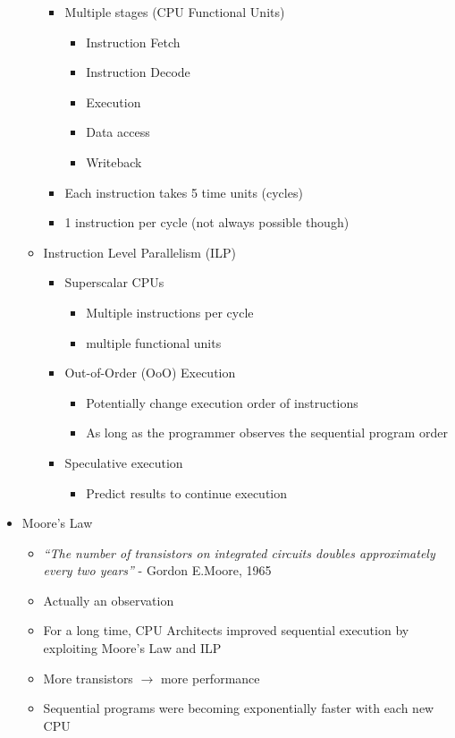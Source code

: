 \documentclass[a4paper]{article}
\begin{document}
\begin{itemize}
\begin{itemize}
\begin{itemize}
\item Multiple stages (CPU Functional Units)
\begin{itemize}
\item Instruction Fetch
\item Instruction Decode
\item Execution
\item Data access
\item Writeback
\end{itemize}
\item Each instruction takes 5 time units (cycles)
\item 1 instruction per cycle (not always possible though)
\end{itemize}
\item Instruction Level Parallelism (ILP)
\begin{itemize}
\item Superscalar CPUs
\begin{itemize}
\item Multiple instructions per cycle
\item multiple functional units
\end{itemize}
\item Out-of-Order (OoO) Execution
\begin{itemize}
\item Potentially change execution order of instructions
\item As long as the programmer observes the sequential program order
\end{itemize}
\item Speculative execution
\begin{itemize}
\item Predict results to continue execution
\end{itemize}
\end{itemize}
\end{itemize}
\item Moore's Law
\begin{itemize}
\item\emph{``The number of transistors on integrated circuits doubles approximately every two years''} - Gordon E.Moore, 1965
\item Actually an observation
\item For a long time, CPU Architects improved sequential execution by exploiting Moore's Law and ILP
\item More transistors $\to$ more performance
\item Sequential programs were becoming exponentially faster with each new CPU

\end{itemize}
\end{itemize}
\end{document}
